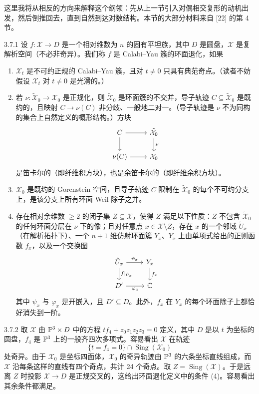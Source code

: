 这里我将从相反的方向来解释这个纲领：先从上一节引入对偶相交复形的动机出发，然后倒推回去，直到自然到达对数结构。本节的大部分材料来自 [22] 的第 4 节。

\begin{definition}{3.7.1}
设 $f:\mathcal X\to D$ 是一个相对维数为 $n$ 的固有平坦族，其中 $D$ 是圆盘，$\mathcal X$ 是复解析空间（不必非奇异）。我们称 $f$ 是 Calabi--Yau 簇的环面退化，如果
\begin{enumerate}[label=(\arabic*)]
\item $\mathcal X_t$ 是不可约正规的 Calabi--Yau 簇，且对 $t\ne0$ 只具有典范奇点。（读者不妨假设 $\mathcal X_t$ 对 $t\ne0$ 是光滑的。）
\item 若 $\nu:\tilde{\mathcal X}_0\to\mathcal X_0$ 是正规化，则 $\tilde{\mathcal X}_0$ 是环面簇的不交并，导子轨迹 $C\subseteq\tilde{\mathcal X}_0$ 是既约的，且映射 $C\to\nu(C)$ 非分歧、一般地二对一。（导子轨迹是 $\nu$ 不为同构的集合上自然定义的概形结构。）方块
\[
\begin{tikzcd}
C \arrow[r] \arrow[d] & \tilde{\mathcal X}_0 \arrow[d, "\nu"]\\
\nu(C) \arrow[r] & \mathcal X_0
\end{tikzcd}
\]
是笛卡尔的（即纤维积方块），也是余笛卡尔的（即纤维余积方块）。
\item $\mathcal X_0$ 是既约的 Gorenstein 空间，且导子轨迹 $C$ 限制在 $\tilde{\mathcal X}_0$ 的每个不可约分支上，是该分支上所有环面 Weil 除子之并。
\item 存在相对余维数 $\ge2$ 的闭子集 $Z\subseteq\mathcal X$，使得 $Z$ 满足以下性质：$Z$ 不包含 $\tilde{\mathcal X}_0$ 的任何环面分层在 $\nu$ 下的像；且对任意点 $x\in\mathcal X\setminus Z$，存在 $x$ 的一个邻域 $\tilde U_x$（在解析拓扑下）、一个 $n+1$ 维仿射环面簇 $Y_x$、$Y_x$ 上由单项式给出的正则函数 $f_x$，以及一个交换图
\[
\begin{tikzcd}
\tilde U_x \arrow[r, "\psi_x"] \arrow[d, "f|_{\tilde U_x}"] & Y_x \arrow[d, "f_x"]\\
D' \arrow[r, "\varphi_x"'] & \C
\end{tikzcd}
\]
其中 $\psi_x$ 与 $\varphi_x$ 是开嵌入，且 $D'\subseteq D$。此外，$f_x$ 在 $Y_x$ 的每个环面除子上都恰好消失到一阶。
\end{enumerate}
\end{definition}

\begin{example}{3.7.2}
取 $\mathcal X$ 由 $\mathbb{P}^3\times D$ 中的方程 $tf_4+z_0z_1z_2z_3=0$ 定义，其中 $D$ 是以 $t$ 为坐标的圆盘，$f_4$ 是 $\mathbb{P}^3$ 上的一般齐四次多项式。容易看出 $\mathcal X$ 在轨迹
\[
\{t=f_4=0\}\cap\operatorname{Sing}(\mathcal X_0)
\]
处奇异。由于 $\mathcal X_0$ 是坐标四面体，$\mathcal X_0$ 的奇异轨迹由 $\mathbb{P}^3$ 的六条坐标直线组成，而 $\mathcal X$ 沿每条这样的直线有四个奇点，共计 24 个奇点。取 $Z=\operatorname{Sing}(\mathcal X)$。于是远离 $Z$ 时投影 $\mathcal X\to D$ 是正规交叉的，这给出环面退化定义中的条件 (4)。容易看出其余条件都满足。
\end{example}

